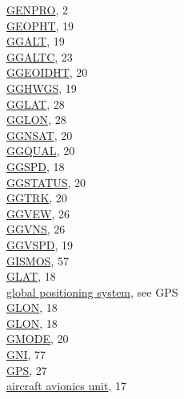 \documentclass[
  english,
]{book}
\begin{document}
\href{./1-introduction\#background-information}{GENPRO}, 2\\
\href{./3-the-state-of-the-aircraft.html\#geopth}{GEOPHT}, 19\\
\href{./3-the-state-of-the-aircraft.html\#ggalt}{GGALT}, 19\\
\href{./3-the-state-of-the-aircraft.html\#altx}{GGALTC}, 23\\
\href{./3-the-state-of-the-aircraft.html\#ggeoidht}{GGEOIDHT}, 20\\
\href{./3-the-state-of-the-aircraft.html\#gghwgs}{GGHWGS}, 19\\
\href{./3-the-state-of-the-aircraft.html\#gglat}{GGLAT}, 28\\
\href{./3-the-state-of-the-aircraft.html\#gglon}{GGLON}, 28\\
\href{./3-the-state-of-the-aircraft.html\#ggnsat}{GGNSAT}, 20\\
\href{./3-the-state-of-the-aircraft.html\#ggqual}{GGQUAL}, 20\\
\href{./3-the-state-of-the-aircraft.html\#ggspd}{GGSPD}, 18\\
\href{./3-the-state-of-the-aircraft.html\#ggstatus\%7C}{GGSTATUS}, 20\\
\href{./3-the-state-of-the-aircraft.html\#ggtrk}{GGTRK}, 20\\
\href{./3-the-state-of-the-aircraft.html\#ggvew}{GGVEW}, 26\\
\href{./3-the-state-of-the-aircraft.html\#ggvns}{GGVNS}, 26\\
\href{./3-the-state-of-the-aircraft.html\#ggvspd}{GGVSPD}, 19\\
\href{./3-the-state-of-the-aircraft.html\#special-use-remote}{GISMOS},
57\\
\href{./3-the-state-of-the-aircraft.html\#gglat}{GLAT}, 18\\
\href{./3-the-state-of-the-aircraft.html\#global-positioning-systems}{global
positioning system}, see GPS\\
\href{./3-the-state-of-the-aircraft.html\#gglon}{GLON}, 18\\
\href{./3-the-state-of-the-aircraft.html\#gglon}{GLON}, 18\\
\href{./3-the-state-of-the-aircraft.html\#gmode}{GMODE}, 20\\
\href{./7-aerosol-particle-measurements.html\#special-aerosol}{GNI},
77\\
\href{./3-the-state-of-the-aircraft.html\#global-positioning-systems}{GPS},
27\\
\hspace*{0.333em}\hspace*{0.333em}\href{./3-the-state-of-the-aircraft.html\#gglat}{aircraft
avionics unit}, 17\\
\end{document}
